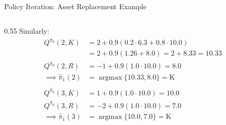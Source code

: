 \documentclass[10pt]{beamer}
\DeclareMathOperator*{\argmax}{argmax} %
\begin{document}
\begin{frame}{Policy Iteration: Asset Replacement Example}
\begin{columns}[T]
\begin{column}{0.55\textwidth}
             Similarly: \scriptsize %
            \begin{align*}
                 Q^{\hat{\pi}_0}(2,K) &= 2 + 0.9(0.2 \cdot 6.3 + 0.8 \cdot 10.0) \\
                                &= 2 + 0.9(1.26 + 8.0) = 2 + 8.33 = 10.33 \\
                 Q^{\hat{\pi}_0}(2,R) &= -1 + 0.9(1.0 \cdot 10.0) = 8.0 \\
                 \implies \hat{\pi}_1(2) &= \argmax \{10.33, 8.0\} = \text{K} \\
                 \\
                 Q^{\hat{\pi}_0}(3,K) &= 1 + 0.9(1.0 \cdot 10.0) = 10.0 \\
                 Q^{\hat{\pi}_0}(3,R) &= -2 + 0.9(1.0 \cdot 10.0) = 7.0 \\
                 \implies \hat{\pi}_1(3) &= \argmax \{10.0, 7.0\} = \text{K} %

\end{align*}
\end{column}
\end{columns}
\end{frame}
\end{document}
